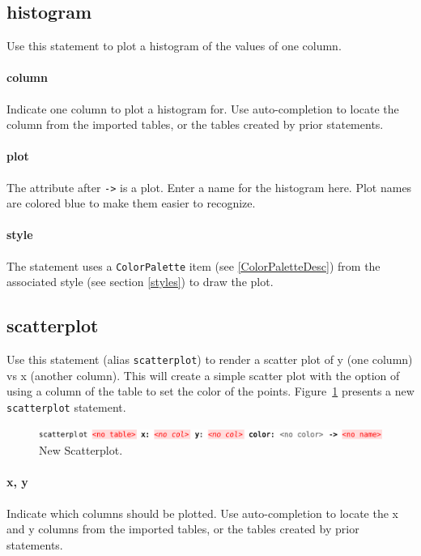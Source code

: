 \subsection{histogram}
Use this statement to plot a histogram of the values of one column.
\paragraph{column}
Indicate one column to plot a histogram for. Use auto-completion to locate the column from the imported tables, or the tables created by prior statements. 

\paragraph{plot}
The attribute after \texttt{->} is a plot. Enter a name for the histogram here. Plot names are colored blue to make them easier to recognize.

\paragraph{style}
The statement uses a \texttt{Color\allowbreak{}Palette} item (see \ref{ColorPaletteDesc}) from the associated style (see section \ref{styles}) to draw the plot. 

\subsection{scatterplot}
Use this statement (alias \texttt{scatterplot}) to render a scatter plot of y (one column) vs x (another column). This will create a simple scatter plot with the option of using a column of the table to set the color of the points. Figure~\ref{fig:NewScatterplot} presents a new \texttt{scatterplot} statement.
\begin{figure}[h!tbp]
  \includegraphics[width=\figWidthWide]{figures/Scatterplot.pdf}
  \caption[New Scatterplot.]{New Scatterplot.}
  \label{fig:NewScatterplot}
\end{figure}

\paragraph{x, y}
Indicate which columns should be plotted. Use auto-completion to locate the x and y columns from the imported tables, or the tables created by prior statements. 

